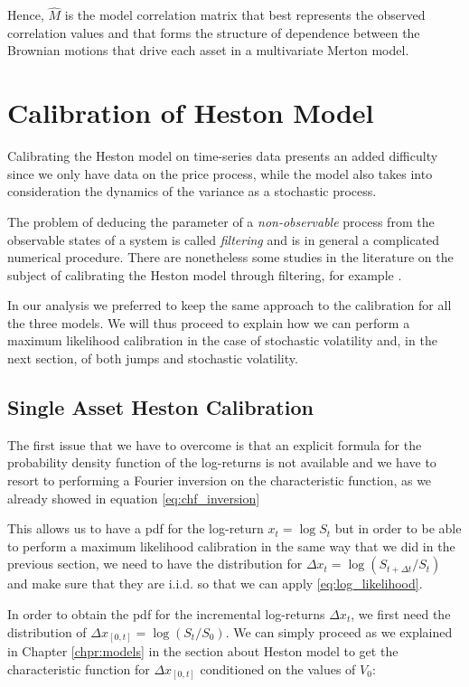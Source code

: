 Hence, $\widehat{M}$ is the model correlation matrix that best represents the observed correlation values and that forms the structure of dependence between the Brownian motions that drive each asset in a multivariate Merton model.


\bigskip
\section{Calibration of Heston Model}
\label{sec:heston_cal}
Calibrating the Heston model on time-series data presents an added difficulty since we only have data on the price process, while the model also takes into consideration the dynamics of the variance as a stochastic process. 

The problem of deducing the parameter of a \textit{non-observable} process from the observable states of a system is called \textit{filtering} and is in general a complicated numerical procedure. There are nonetheless some studies in the literature on the subject of calibrating the Heston model through filtering, for example \citep{filtering}.

In our analysis we preferred to keep the same approach to the calibration for all the three models. We will thus proceed to explain how we can perform a maximum likelihood calibration in the case of stochastic volatility and, in the next section, of both jumps and stochastic volatility.

\subsection{Single Asset Heston Calibration}
The first issue that we have to overcome is that an explicit formula for the probability density function of the log-returns is not available and we have to resort to performing a Fourier inversion on the characteristic function, as we already showed in equation \eqref{eq:chf_inversion}

This allows us to have a pdf for the log-return $x_t = \log S_t $ but in order to be able to perform a maximum likelihood calibration in the same way that we did in the  previous section, we need to have the distribution for $\Delta x_t = \log (S_{t + \Delta t} / S_t)$ and make sure that they are i.i.d. so that we can apply \eqref{eq:log_likelihood}.

In order to obtain the pdf for the incremental log-returns $\Delta x_t$, we first need the distribution of  $\Delta x_{[0, t] }= \log (S_t / S_0)$. We can simply proceed as we explained in Chapter \ref{chpr:models} in the section about Heston model to get the characteristic function for $\Delta x_{[0, t] }$ conditioned on the values of $V_0$: 


